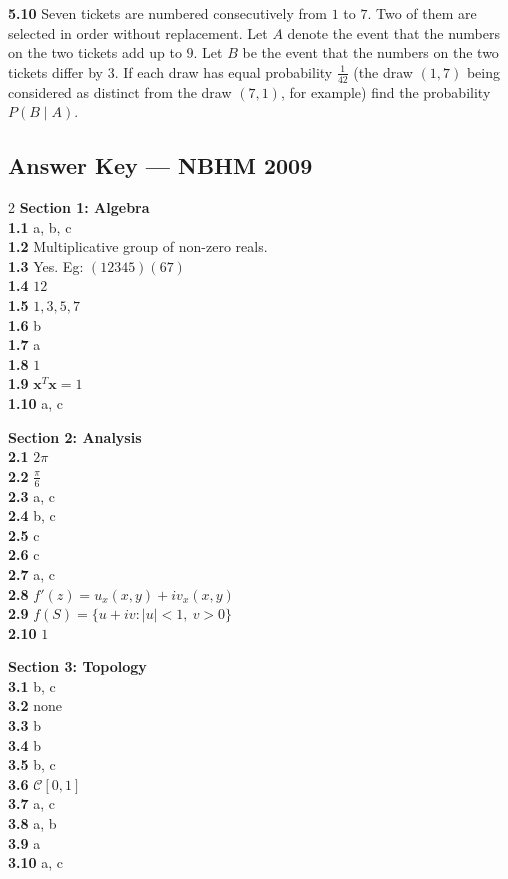 \documentclass[11pt,a4paper]{article}
\newcommand{\examsec}[1]{%
  \subsection*{#1}
  \vspace{-2pt}
}
\newcommand{\qitem}[1]{\par\medskip\noindent\textbf{#1}\hspace{0.5em}}
\begin{document}
\qitem{5.10} Seven tickets are numbered consecutively from $1$ to $7$. Two of them are selected in order without replacement. Let $A$ denote the event that the numbers on the two tickets add up to $9$. Let $B$ be the event that the numbers on the two tickets differ by $3$. If each draw has equal probability $\frac{1}{42}$ (the draw $(1, 7)$ being considered as distinct from the draw $(7, 1)$, for example) find the probability $P(B \mid A)$.

\examsec{Answer Key --- NBHM 2009}
\begin{multicols}{2}
\textbf{Section 1: Algebra}\\
\textbf{1.1} a, b, c\\
\textbf{1.2} Multiplicative group of non-zero reals.\\
\textbf{1.3} Yes. Eg: $(12345)(67)$\\
\textbf{1.4} $12$\\
\textbf{1.5} $1, 3, 5, 7$\\
\textbf{1.6} b\\
\textbf{1.7} a\\
\textbf{1.8} $1$\\
\textbf{1.9} $\mathbf{x}^T\mathbf{x} = 1$\\
\textbf{1.10} a, c

\medskip
\textbf{Section 2: Analysis}\\
\textbf{2.1} $2\pi$\\
\textbf{2.2} $\frac{\pi}{6}$\\
\textbf{2.3} a, c\\
\textbf{2.4} b, c\\
\textbf{2.5} c\\
\textbf{2.6} c\\
\textbf{2.7} a, c\\
\textbf{2.8} $f'(z) = u_x(x, y) + iv_x(x, y)$\\
\textbf{2.9} $f(S) = \{u + iv : |u| < 1,\ v > 0\}$\\
\textbf{2.10} $1$

\medskip
\textbf{Section 3: Topology}\\
\textbf{3.1} b, c\\
\textbf{3.2} none\\
\textbf{3.3} b\\
\textbf{3.4} b\\
\textbf{3.5} b, c\\
\textbf{3.6} $\mathcal{C}[0, 1]$\\
\textbf{3.7} a, c\\
\textbf{3.8} a, b\\
\textbf{3.9} a\\
\textbf{3.10} a, c


\end{multicols}
\end{document}
